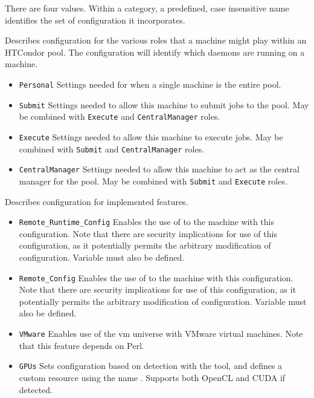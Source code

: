 There are four  values.
Within a category, a predefined, case insensitive name identifies
the set of configuration it incorporates. 
\begin{description}

\label{usecategory:ROLE}
\item[\MacroNI{ROLE}]
  Describes configuration for the various roles that a machine might
  play within an HTCondor pool. The configuration will identify which
  daemons are running on a machine.
  \begin{itemize}
    \item \texttt{Personal}
    Settings needed for when a single machine is the entire pool.
    \item \texttt{Submit}
    Settings needed to allow this machine to submit jobs to the pool.
    May be combined with \texttt{Execute} and \texttt{CentralManager} roles.
    \item \texttt{Execute}
    Settings needed to allow this machine to execute jobs.
    May be combined with \texttt{Submit} and \texttt{CentralManager} roles.
    \item \texttt{CentralManager}
    Settings needed to allow this machine to act as the central manager
    for the pool.
    May be combined with \texttt{Submit} and \texttt{Execute} roles.
  \end{itemize}

\label{usecategory:FEATURE}
\item[\MacroNI{FEATURE}]
  Describes configuration for implemented features. 
  \begin{itemize}
    \item \texttt{Remote\_Runtime\_Config}
    Enables the use of   to the machine with
    this configuration.
    Note that there are security implications for use of this configuration,
    as it potentially permits the arbitrary modification of configuration.
    Variable  must also be defined.
    \item \texttt{Remote\_Config}
    Enables the use of   to the machine with
    this configuration.
    Note that there are security implications for use of this configuration,
    as it potentially permits the arbitrary modification of configuration.
    Variable  must also be defined.
    \item \texttt{VMware}
    Enables use of the vm universe with VMware virtual machines.
    Note that this feature depends on Perl. 
    \item \texttt{GPUs}
    Sets configuration based on detection with the 
    tool, and defines a custom resource using the name .
    Supports both OpenCL and CUDA if detected. 
  \end{itemize}


\end{description}
